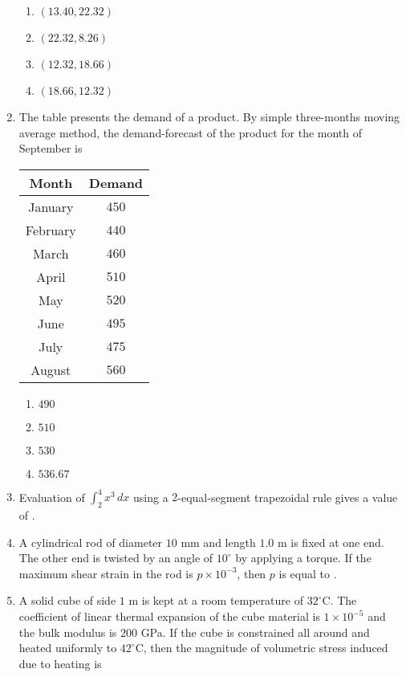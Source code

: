 \documentclass{article}
\newcommand{\brak}[1]{\left( #1 \right)}
\begin{document}
\begin{enumerate}
\begin{enumerate}
    \item $\brak{13.40, 22.32}$
    \item $\brak{22.32, 8.26}$
    \item $\brak{12.32, 18.66}$
    \item $\brak{18.66, 12.32}$
\end{enumerate}

\item The table presents the demand of a product. By simple three-months moving average method, the demand-forecast of the product for the month of September is

\begin{center}
\begin{tabular}{|c|c|}
\hline
\textbf{Month} & \textbf{Demand} \\
\hline
January & $450$ \\
February & $440$ \\
March & $460$ \\
April & $510$ \\
May & $520$ \\
June & $495$ \\
July & $475$ \\
August & $560$ \\
\hline
\end{tabular}
\end{center}

\begin{enumerate}
    \item $490$
    \item $510$
    \item $530$
    \item $536.67$
\end{enumerate}

\item Evaluation of $\int_{2}^{4} x^3 \, dx$ using a $2$-equal-segment trapezoidal rule gives a value of .

\item A cylindrical rod of diameter $10$ mm and length $1.0$ m is fixed at one end. The other end is twisted by an angle of $10^\circ$ by applying a torque. If the maximum shear strain in the rod is $p \times 10^{-3}$, then $p$ is equal to .
    
\item A solid cube of side $1$ m is kept at a room temperature of $32^\circ$C. The coefficient of linear thermal expansion of the cube material is $1 \times 10^{-5} $ and the bulk modulus is $200$ GPa. If the cube is constrained all around and heated uniformly to $42^\circ$C, then the magnitude of volumetric stress induced due to heating is 
    

\end{enumerate}
\end{document}

